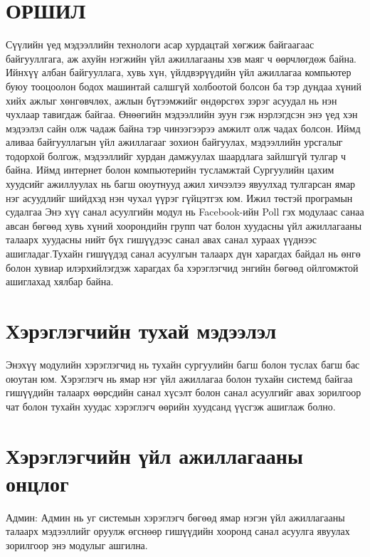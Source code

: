 \documentclass[12pt]{article}
\begin{document}
	
\section                            {ОРШИЛ}

	Сүүлийн үед мэдээллийн технологи асар хурдацтай хөгжиж байгаагаас байгууллгага, аж ахуйн нэгжийн үйл ажиллагааны хэв маяг ч өөрчлөгдөж байна. 
	Ийнхүү албан байгууллага, хувь хүн, үйлдвэрүүдийн үйл ажиллагаа компьютер буюу тооцоолон бодох машинтай салшгүй холбоотой болсон ба тэр дундаа хүний хийх ажлыг хөнгөвчлөх, ажлын бүтээмжийг өндөрсгөх зэрэг асуудал нь нэн чухлаар тавигдаж байгаа. 
	Өнөөгийн мэдээллийн зуун гэж нэрлэгдсэн энэ үед хэн мэдээлэл сайн олж чадаж байна тэр чинээгээрээ амжилт олж чадах болсон. Иймд аливаа байгууллагын үйл ажиллагааг зохион байгуулах, мэдээллийн урсгалыг тодорхой болгож, мэдээллийг хурдан дамжуулах шаардлага зайлшгүй тулгар ч байна. Иймд интернет болон компьютерийн тусламжтай Сургуулийн цахим хуудсийг ажиллуулах нь багш оюутнууд ажил хичээлээ явуулхад тулгарсан ямар нэг асуудлийг шийдхэд нэн чухал үүрэг гүйцэтгэх юм.
	Ижил төстэй програмын судалгаа
	Энэ хүү санал асуулгийн модул нь Facebook-ийн Poll гэх модулаас санаа авсан бөгөөд хувь хүний хоорондийн групп чат болон хуудасны үйл ажиллагааны талаарх хуудасны нийт бүх гишүүдээс санал авах санал хураах үүднээс ашигладаг.Тухайн гишүүдэд санал асуулгын талаарх дүн харагдах байдал нь өнгө болон  хувиар илэрхийлэгдэж харагдах ба хэрэглэгчид энгийн бөгөөд ойлгомжтой ашиглахад хялбар байна. 

\section  {Хэрэглэгчийн тухай мэдээлэл}

	Энэхүү модулийн хэрэглэгчид нь тухайн сургуулийн багш болон туслах багш бас оюутан юм. Хэрэглэгч нь ямар нэг үйл ажиллагаа болон тухайн системд байгаа гишүүдийн талаарх өөрсдийн санал хүсэлт болон санал асуулгийг авах зорилгоор чат болон тухайн хуудас хэрэглэгч өөрийн хуудсанд үүсгэж ашиглаж болно.
	
\section  {Хэрэглэгчийн үйл ажиллагааны онцлог}

       {Админ:} Админ нь уг системын хэрэглэгч бөгөөд ямар нэгэн үйл ажиллагааны талаарх мэдээллийг оруулж өгснөөр гишүүдийн хооронд санал асуулга явуулах зорилгоор энэ модулыг ашгилна.
   
\end{document}
